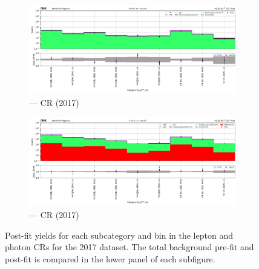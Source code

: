 \begin{figure}[htbp]
    \begin{subfigure}[b]{0.66\textwidth}
        \includegraphics[width=\textwidth]{chapters/higgstoinv/figures/mountain_ranges/2017/VH/Zee_tree_fit_s-abs_values_VH_cats.pdf}
        \caption{\VH --- \doubleEleCr \gls{CR} (2017)}
    \end{subfigure}

    \begin{subfigure}[b]{0.66\textwidth}
        \includegraphics[width=\textwidth]{chapters/higgstoinv/figures/mountain_ranges/2017/VH/Photon_tree_fit_s-abs_values_VH_cats.pdf}
        \caption{\VH --- \singlePhotonCr \gls{CR} (2017)}
    \end{subfigure}
    \caption[Post-fit yields for each \VH subcategory and \ptmiss bin in the lepton and photon control regions for the 2017 dataset]{Post-fit yields for each \VH subcategory and \ptmiss bin in the lepton and photon \glspl{CR} for the 2017 dataset. The total background pre-fit and post-fit is compared in the lower panel of each subfigure.}
    \label{fig:htoinv_mountain_range_VH_2017_CRs}
\end{figure}


